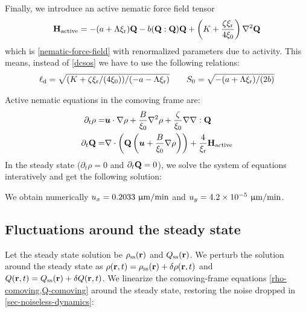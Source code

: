 \documentclass[a5paper]{article}
\begin{document}
Finally, we introduce an active nematic force field tensor
\begin{align}
    \label{active-nematic-force-field}
    \mathbf{H}_\text{active} =- (a+\Lambda \xi_{\rm r}) \mathbf{Q} - b (\mathbf{Q}:\mathbf{Q}) \mathbf{Q} + \left(K+\frac{\zeta\xi_{\rm r}}{4\xi_0}\right) \nabla^2 \mathbf{Q}
\end{align}
which is \cref{nematic-force-field} with renormalized parameters due to activity. This means, instead of \cref{dcsos} we have to use the following relations:
\begin{align}
    \label{dcsos-renormalized}
    \ell_{\rm d} = \sqrt{(K+\zeta\xi_{\rm r}/(4\xi_0))/(-a-\Lambda \xi_{\rm r})} \qquad S_0 = \sqrt{-(a+\Lambda \xi_{\rm r})/(2b)}
\end{align}

Active nematic equations in the comoving frame are:
\begin{align}
    \label{rho-comoving}
    \partial_t \rho =&\boldsymbol{u} \cdot \nabla \rho+
    \frac{B}{\xi_0}\nabla^2 \rho
     + \frac{\zeta}{\xi_0} \nabla\nabla:\mathbf{Q} 
    \\
    \label{Q-comoving}
    \partial_t \mathbf{Q} =& 
    \nabla\cdot \left(\mathbf{Q} \left(\boldsymbol{u} + \frac{B}{\xi_0} \nabla \rho\right) \right)
   + \frac{4}{\xi_{\rm r}}\mathbf{H}_\text{active}
\end{align}
In the steady state ($\partial_t \rho = 0$ and $\partial_t \mathbf{Q} = 0$), we solve the system of equations interatively and get the following solution:

We obtain numerically $u_x=0.2033~\upmu\mathrm{m}/\text{min}$ and $u_y=4.2\times10^{-5}~\upmu\mathrm{m}/\text{min}$.

\subsection{Fluctuations around the steady state}
Let the steady state solution be $\rho_{\mathrm{ss}}(\mathbf{r})$ and $Q_{\mathrm{ss}}(\mathbf{r})$. We perturb the solution around the steady state as $\rho(\mathbf{r},t) = \rho_{\mathrm{ss}}(\mathbf{r}) + \delta\rho(\mathbf{r},t)$ and $Q(\mathbf{r},t) = Q_{\mathrm{ss}}(\mathbf{r}) + \delta Q(\mathbf{r},t)$. We linearize the comoving-frame equations \cref{rho-comoving,Q-comoving} around the steady state, restoring the noise dropped in \cref{sec-noiseless-dynamics}:
\end{document}
